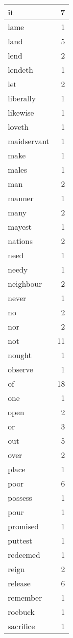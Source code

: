 \begin{center}
\begin{longtable}{l|r}
it & 7 \\ \hline
lame & 1 \\ \hline
land & 5 \\ \hline
lend & 2 \\ \hline
lendeth & 1 \\ \hline
let & 2 \\ \hline
liberally & 1 \\ \hline
likewise & 1 \\ \hline
loveth & 1 \\ \hline
maidservant & 1 \\ \hline
make & 1 \\ \hline
males & 1 \\ \hline
man & 2 \\ \hline
manner & 1 \\ \hline
many & 2 \\ \hline
mayest & 1 \\ \hline
nations & 2 \\ \hline
need & 1 \\ \hline
needy & 1 \\ \hline
neighbour & 2 \\ \hline
never & 1 \\ \hline
no & 2 \\ \hline
nor & 2 \\ \hline
not & 11 \\ \hline
nought & 1 \\ \hline
observe & 1 \\ \hline
of & 18 \\ \hline
one & 1 \\ \hline
open & 2 \\ \hline
or & 3 \\ \hline
out & 5 \\ \hline
over & 2 \\ \hline
place & 1 \\ \hline
poor & 6 \\ \hline
possess & 1 \\ \hline
pour & 1 \\ \hline
promised & 1 \\ \hline
puttest & 1 \\ \hline
redeemed & 1 \\ \hline
reign & 2 \\ \hline
release & 6 \\ \hline
remember & 1 \\ \hline
roebuck & 1 \\ \hline
sacrifice & 1 \\ \hline

\end{longtable}
\end{center}
